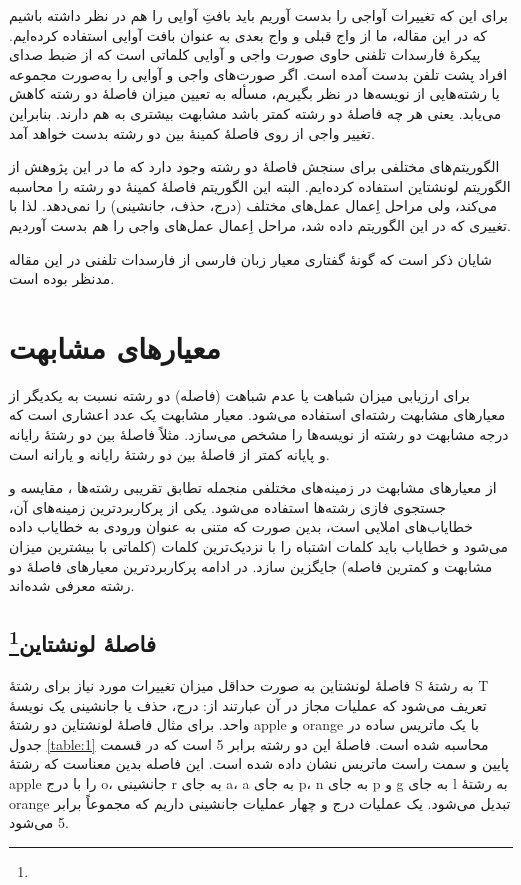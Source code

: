 \documentclass[12pt,onecolumn,a4paper]{article}
\begin{document}
    برای این که تغییرات آواجی را بدست آوریم باید بافتِ آوایی را هم در نظر داشته باشیم که در این مقاله، ما از واج قبلی و واج بعدی به عنوان بافت آوایی استفاده کرده‌ایم. پیکرهٔ فارسدات تلفنی حاوی صورت واجی و آوایی کلماتی است که از ضبط صدای افراد پشت تلفن بدست آمده است. اگر صورت‌های واجی و آوایی را به‌صورت مجموعه یا رشته‌هایی از نویسه‌ها در نظر بگیریم، مسأله به تعیین میزان فاصلۀ دو رشته کاهش می‌یابد. یعنی هر چه فاصلۀ دو رشته کمتر باشد مشابهت بیشتری به هم دارند. بنابراین تغییر واجی از روی فاصلۀ کمینۀ بین دو رشته بدست خواهد آمد.
    \par
    الگوریتم‌های مختلفی برای سنجش فاصلۀ دو رشته وجود دارد که ما در این پژوهش از الگوریتم لونشتاین  استفاده کرده‌ایم. البته این الگوریتم فاصلۀ کمینۀ دو رشته را محاسبه می‌کند، ولی مراحل اِعمال عمل‌های مختلف (درج، حذف، جانشینی) را نمی‌دهد. لذا با تغییری که در این الگوریتم داده شد، مراحل اِعمال عمل‌های واجی را هم بدست آوردیم.
    \par
    شایان ذکر است که گونهٔ گفتاری معیار زبان فارسی از فارسدات تلفنی در این مقاله مدنظر بوده است.

    \section{معیارهای مشابهت}
    برای ارزیابی میزان شباهت یا عدم شباهت (فاصله) دو رشته نسبت به یکدیگر از معیارهای مشابهت رشته‌ای استفاده می‌شود. معیار مشابهت یک عدد اعشاری است که درجه مشابهت دو رشته از نویسه‌ها را مشخص می‌سازد. مثلاً فاصلۀ بین دو رشتۀ رایانه و پایانه کمتر از فاصلۀ بین دو رشتۀ رایانه و یارانه است.
    \par
    از معیارهای مشابهت در زمینه‌های مختلفی منجمله تطابق تقریبی رشته‌ها ، مقایسه  و جستجوی فازی رشته‌ها  استفاده می‌شود. یکی از پرکاربردترین زمینه‌های آن، خطایاب‌های املایی  است، بدین صورت که متنی به عنوان ورودی به خطایاب داده می‌شود و خطایاب باید کلمات اشتباه را با نزدیک‌ترین کلمات (کلماتی با بیشترین میزان مشابهت و کمترین فاصله) جایگزین سازد. در ادامه پرکاربردترین معیارهای فاصلۀ دو رشته معرفی شده‌اند.

    \subsection{فاصلۀ لونشتاین\protect\footnote{}}
    فاصلۀ لونشتاین  به صورت حداقل میزان تغییرات مورد نیاز برای رشتۀ S به رشتۀ T تعریف می‌شود که عملیات مجاز در آن عبارتند از: درج، حذف یا جانشینی یک نویسۀ واحد. برای مثال فاصلۀ لونشتاین دو رشتۀ apple و orange با یک ماتریس ساده در جدول \ref{table:1} محاسبه شده است. فاصلۀ این دو رشته برابر 5 است که در قسمت پایین و سمت راست ماتریس نشان داده شده است. این فاصله بدین معناست که رشتۀ apple را با درج o، جانشینی r به جای a، a به جای p، n به جای p و g به جای l به رشتۀ orange تبدیل می‌شود. یک عملیات درج و چهار عملیات جانشینی داریم که مجموعاً برابر 5 می‌شود.
\end{document}
